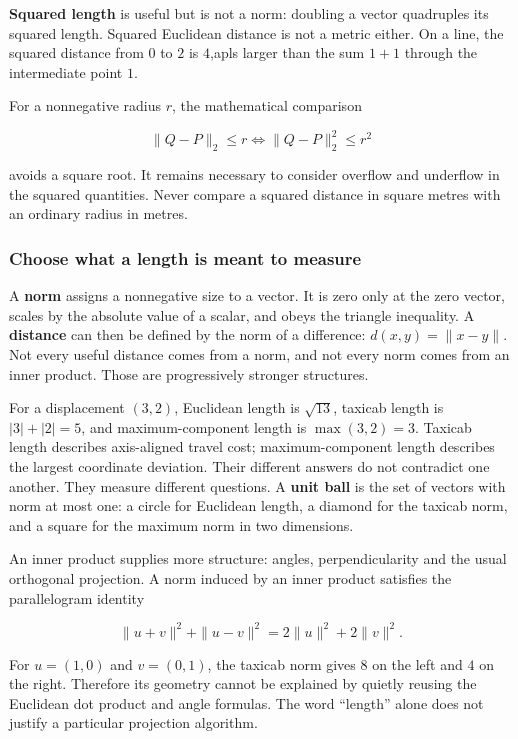 \textbf{Squared length} is useful but is not a norm: doubling a vector quadruples its squared length. Squared Euclidean distance is not a metric either. On a line, the squared distance from \(0\) to \(2\) is \(4\),apls larger than the sum \(1+1\) through the intermediate point \(1\).

For a nonnegative radius \(r\), the mathematical comparison

\[
\|Q-P\|_2\le r
\iff\|Q-P\|_2^2\le r^2
\]

avoids a square root. It remains necessary to consider overflow and underflow in the squared quantities. Never compare a squared distance in square metres with an ordinary radius in metres.

\subsubsection{Choose what a length is meant to measure}\label{choose-what-a-length-is-meant-to-measure}

A \textbf{norm} assigns a nonnegative size to a vector. It is zero only at the zero vector, scales by the absolute value of a scalar, and obeys the triangle inequality. A \textbf{distance} can then be defined by the norm of a difference: \(d(x,y)=\|x-y\|\). Not every useful distance comes from a norm, and not every norm comes from an inner product. Those are progressively stronger structures.

For a displacement \((3,2)\), Euclidean length is \(\sqrt{13}\), taxicab length is \(|3|+|2|=5\), and maximum-component length is \(\max(3,2)=3\). Taxicab length describes axis-aligned travel cost; maximum-component length describes the largest coordinate deviation. Their different answers do not contradict one another. They measure different questions. A \textbf{unit ball} is the set of vectors with norm at most one: a circle for Euclidean length, a diamond for the taxicab norm, and a square for the maximum norm in two dimensions.

An inner product supplies more structure: angles, perpendicularity and the usual orthogonal projection. A norm induced by an inner product satisfies the parallelogram identity

\[
\|u+v\|^2+\|u-v\|^2=2\|u\|^2+2\|v\|^2.
\]

For \(u=(1,0)\) and \(v=(0,1)\), the taxicab norm gives \(8\) on the left and \(4\) on the right. Therefore its geometry cannot be explained by quietly reusing the Euclidean dot product and angle formulas. The word ``length'' alone does not justify a particular projection algorithm.

